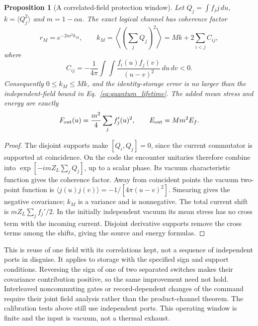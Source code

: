 \documentclass[11pt]{article}
\newtheorem{proposition}[theorem]{Proposition}
\theoremstyle{definition}
\theoremstyle{remark}
\begin{document}
\begin{proposition}[A correlated-field protection window]
\label{prop:one_field}
Let $Q_j=\int f_jj\,du$, $k=\langle Q_j^2\rangle$ and
$m=1-\alpha a$. The exact logical channel has coherence factor
\begin{equation}
 r_M=e^{-2m^2k_M},\qquad
 k_M=\left\langle\left(\sum_jQ_j\right)^2\right\rangle
 =Mk+2\sum_{i<j}C_{ij},
 \label{eq:correlated_window}
\end{equation}
where
\begin{equation}
 C_{ij}=-\frac1{4\pi}\int\!\!\int
       \frac{f_i(u)f_j(v)}{(u-v)^2}\,du\,dv<0.
 \label{eq:separated_covariance}
\end{equation}
Consequently $0\le k_M\le Mk$, and the identity-storage error is
no larger than the independent-field bound in
Eq.~\eqref{eq:quantum_lifetime}. The added mean stress and energy are
exactly
\begin{equation}
 F_{\rm out}(u)=\frac{m^2}{4}\sum_j f_j'(u)^2,
 \qquad E_{\rm out}=Mm^2E_f.
 \label{eq:one_field_source}
\end{equation}
\end{proposition}
\begin{proof}
The disjoint supports make $[Q_i,Q_j]=0$, since the current
commutator is supported at coincidence. On the code the encounter
unitaries therefore combine into
$\exp[-imZ_L\sum_jQ_j]$, up to a scalar phase. Its vacuum
characteristic function gives the coherence factor. Away from
coincident points the vacuum two-point function is
$\langle j(u)j(v)\rangle=-1/[4\pi(u-v)^2]$.
Smearing gives the negative covariance; $k_M$ is a variance and
is nonnegative. The total current shift is
$mZ_L\sum_jf_j'/2$. In the initially independent vacuum its mean
stress has no cross term with the incoming current. Disjoint derivative
supports remove the cross terms among the shifts, giving the source
and energy formulas.
\end{proof}

This is reuse of one field with its correlations kept, not a sequence
of independent ports in disguise. It applies to storage with the
specified sign and support conditions. Reversing the sign of one of
two separated switches makes their covariance contribution positive,
so the same improvement need not hold. Interleaved noncommuting
gates or record-dependent changes of the command require their joint
field analysis rather than the product-channel theorem. The
calibration tests above still use independent ports. This operating
window is finite and the input is vacuum, not a thermal exhaust.
\end{document}
